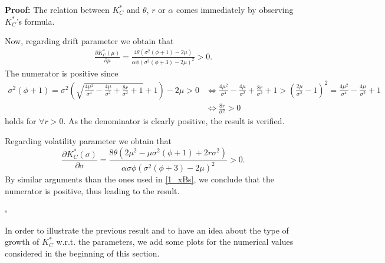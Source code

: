 \textbf{Proof:}
The relation between $K^*_C$ and $\theta$, $r$ or $\alpha$ comes immediately by observing $K^*_C$'s formula.

Now, regarding drift parameter we obtain that
 \begin{align*}
\frac{\partial K^*_C(\mu)}{\partial \mu}=
\frac{4 \theta \left(\sigma ^2 \left(\phi+1\right)-2 \mu \right)}{\alpha \phi \left(\sigma ^2 \left(\phi+3\right)-2 \mu \right)^2}>0.
\end{align*}
The numerator is positive since
\begin{align}
\label{cond2}
\sigma ^2 (\phi+1)=\sigma ^2 \left(\sqrt{\frac{4 \mu ^2}{\sigma ^4}-\frac{4 \mu }{\sigma ^2}+\frac{8 r}{\sigma ^2}+1}+1\right)-2 \mu>0 
& \Leftrightarrow
\frac{4 \mu ^2}{\sigma ^4}-\frac{4 \mu }{\sigma ^2}+\frac{8 r}{\sigma ^2}+1 > \left( \frac{2 \mu}{\sigma^2}-1 \right)^2=\frac{4 \mu ^2}{\sigma ^4}-\frac{4 \mu }{\sigma ^2}+1 \nonumber\\
& \Leftrightarrow
\frac{8 r}{\sigma ^2}>0 \nonumber
\end{align}
holds for $\forall r> 0$. As the denominator is clearly positive, the result is verified.

Regarding volatility parameter we obtain that
\begin{equation*}
    \frac{\partial K^*_C(\sigma)}{\partial \sigma}= 
\frac{8 \theta \left(2 \mu ^2-\mu  \sigma ^2 \left( \phi+1 \right)+2 r \sigma ^2 \right)}{\alpha \sigma  \phi  \left( \sigma ^2 \left( \phi+3 \right)-2 \mu \right)^2}>0.
\end{equation*}
By similar arguments than the ones used in \eqref{1_xBs}, we conclude that the numerator is positive, thus leading to the result.

\begin{flushright}
	$\square$
\end{flushright}

In order to illustrate the previous result and to have an idea about the type of growth of $K^*_C$ w.r.t. the parameters, we add some plots for the numerical values considered in the beginning of this section.

